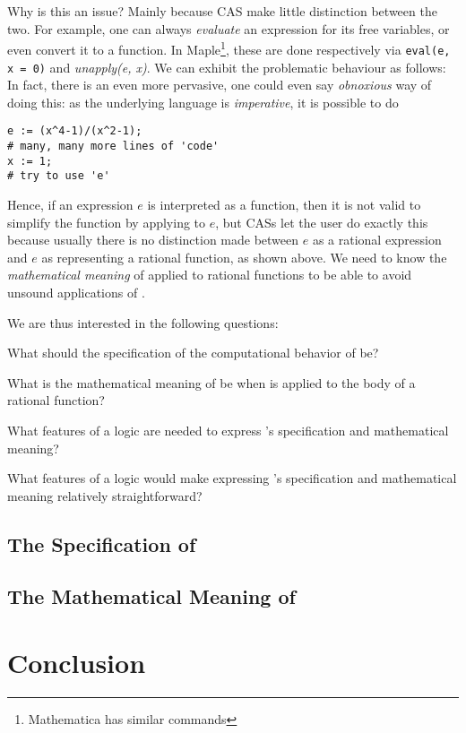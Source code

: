 \documentclass[fleqn]{llncs}
\begin{document}
Why is this an issue? Mainly because CAS make little distinction between
the two.  For example, one can always \emph{evaluate} an expression
for its free variables, or even convert it to a function. In
Maple\footnote{Mathematica has similar commands}, these are done
respectively via \texttt{eval(e, x = 0)} and
\textit{unapply(e, x)}.  We can exhibit the problematic behaviour as
follows:
In fact, there is an even more pervasive, one could even say
\emph{obnoxious} way of doing this: as the underlying language is
\emph{imperative}, it is possible to do
\begin{verbatim}
e := (x^4-1)/(x^2-1);
# many, many more lines of 'code'
x := 1;
# try to use 'e'
\end{verbatim}

Hence, if an expression $e$ is interpreted as a
function, then it is not valid to simplify the function by applying
{\NRE} to $e$, but CASs let the user do exactly this because usually
there is no distinction made between $e$ as a rational expression and
$e$ as representing a rational function, as shown above.  We need to know the
\emph{mathematical meaning} of {\NRE} applied to rational functions to
be able to avoid unsound applications of {\NRE}.


We are thus interested in the following questions:

\be

  \item What should the specification of the computational behavior of
    {\NRE} be?

  \item What is the mathematical meaning of {\NRE} be when {\NRE} is
    applied to the body of a rational function?

  \item What features of a logic are needed to express
    {\NRE}'s specification and mathematical meaning?

  \item What features of a logic would make expressing {\NRE}'s
    specification and mathematical meaning relatively straightforward?

\ee

\subsection{The Specification of {\NRE}}

\subsection{The Mathematical Meaning of {\NRE}}

\section{Conclusion}




\setcounter{tocdepth}{1}
\listoftodos
\setcounter{tocdepth}{0}
\end{document}
